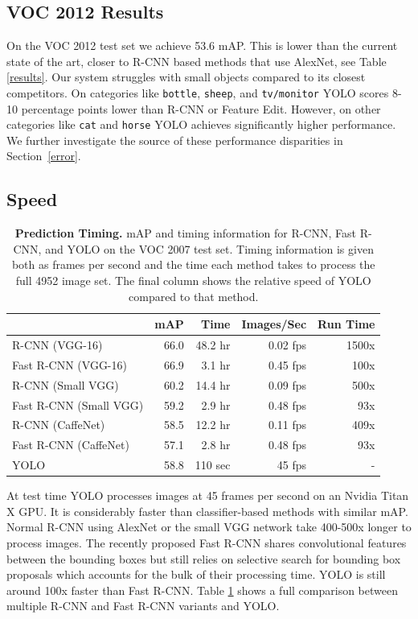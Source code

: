 \documentclass{article} %
\begin{document}
\subsection{VOC 2012 Results}

On the VOC 2012 test set we achieve 53.6 mAP. This is lower than the current state of the art, closer to R-CNN based methods that use AlexNet, see Table \ref{results}. Our system struggles with small objects compared to its closest competitors. On categories like \texttt{bottle}, \texttt{sheep}, and \texttt{tv/monitor} YOLO scores 8-10 percentage points lower than R-CNN or Feature Edit. However, on other categories like \texttt{cat} and \texttt{horse} YOLO achieves significantly higher performance. We further investigate the source of these performance disparities in Section~\ref{error}.

\subsection{Speed}

\begin{table}
\scriptsize
\begin{center}
\begin{tabular}{lrrrr}
 & mAP & Time & Images/Sec & Run Time\\
\hline
R-CNN (VGG-16) & 66.0 & 48.2 hr & 0.02 fps & 1500x \\
Fast R-CNN (VGG-16) & 66.9 & 3.1 hr & 0.45 fps & 100x \\
R-CNN (Small VGG) & 60.2 & 14.4 hr & 0.09 fps & 500x \\
Fast R-CNN (Small VGG) & 59.2 & 2.9 hr & 0.48 fps & 93x \\
R-CNN (CaffeNet) & 58.5 & 12.2 hr & 0.11 fps & 409x \\
Fast R-CNN (CaffeNet) & 57.1 & 2.8 hr & 0.48 fps & 93x \\
YOLO & 58.8 & 110 sec & 45 fps & - \\
\end{tabular}
\end{center}
\caption{\textbf{Prediction Timing.} mAP and timing information for R-CNN, Fast R-CNN, and YOLO on the VOC 2007 test set. Timing information is given both as frames per second and the time each method takes to process the full 4952 image set. The final column shows the relative speed of YOLO compared to that method.}
\label{timing}
\end{table}

At test time YOLO processes images at 45 frames per second on an Nvidia Titan X GPU. It is considerably faster than classifier-based methods with similar mAP. Normal R-CNN using AlexNet or the small VGG network take 400-500x longer to process images. The recently proposed Fast R-CNN shares convolutional features between the bounding boxes but still relies on selective search for bounding box proposals which accounts for the bulk of their processing time. YOLO is still around 100x faster than Fast R-CNN. Table \ref{timing} shows a full comparison between multiple R-CNN and Fast R-CNN variants and YOLO.
\end{document}
